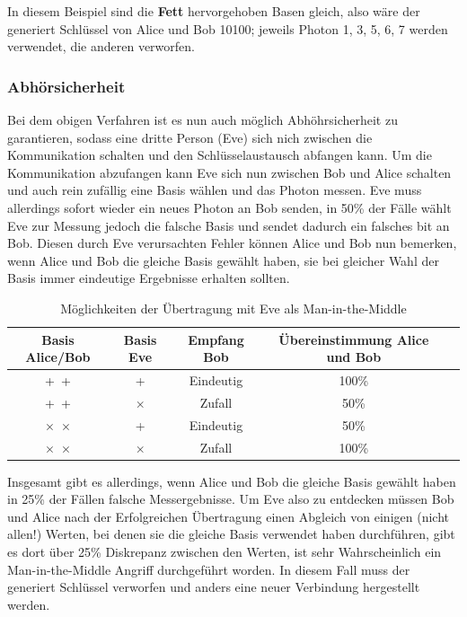 In diesem Beispiel sind die \textbf{Fett} hervorgehoben Basen gleich, also wäre der generiert Schlüssel von Alice und Bob 10100; jeweils Photon 1, 3, 5, 6, 7 werden verwendet, die anderen verworfen.

\subsubsection{Abhörsicherheit}

Bei dem obigen Verfahren ist es nun auch möglich Abhöhrsicherheit zu garantieren, sodass eine dritte Person (Eve) sich nich zwischen die Kommunikation schalten und den Schlüsselaustausch abfangen kann.
Um die Kommunikation abzufangen kann Eve sich nun zwischen Bob und Alice schalten und auch rein zufällig eine Basis wählen und das Photon messen.
Eve muss allerdings sofort wieder ein neues Photon an Bob senden, in 50\% der Fälle wählt Eve zur Messung jedoch die falsche Basis und sendet dadurch ein falsches bit an Bob.
Diesen durch Eve verursachten Fehler können Alice und Bob nun bemerken, wenn Alice und Bob die gleiche Basis gewählt haben, sie bei gleicher Wahl der Basis immer eindeutige Ergebnisse erhalten sollten.

\begin{table}[ht]
    \centering
    \begin{tabular}{|c|c|c|c|c|}
    \hline
    Basis Alice/Bob     & Basis Eve & Empfang Bob   & Übereinstimmung Alice und Bob \\ \hline
    +~+                 & +         & Eindeutig     & 100\% \\ \hline
    +~+                 & $\times$  & Zufall        & 50\%  \\ \hline 
    $\times$~$\times$   & +         & Eindeutig     & 50\%  \\ \hline
    $\times$~$\times$   & $\times$  & Zufall        & 100\% \\ \hline
    
    \end{tabular}
    \caption{Möglichkeiten der Übertragung mit Eve als Man-in-the-Middle \cite{quantenschluesselaustausch}}
    \label{table:eve-moeglichkeiten}
\end{table}

Insgesamt gibt es allerdings, wenn Alice und Bob die gleiche Basis gewählt haben in 25\% der Fällen falsche Messergebnisse. 
Um Eve also zu entdecken müssen Bob und Alice nach der Erfolgreichen Übertragung einen Abgleich von einigen (nicht allen!) Werten, bei denen sie die gleiche Basis verwendet haben durchführen, gibt es dort über 25\% Diskrepanz zwischen den Werten, ist sehr Wahrscheinlich ein Man-in-the-Middle Angriff durchgeführt worden.
In diesem Fall muss der generiert Schlüssel verworfen und anders eine neuer Verbindung hergestellt werden. 


